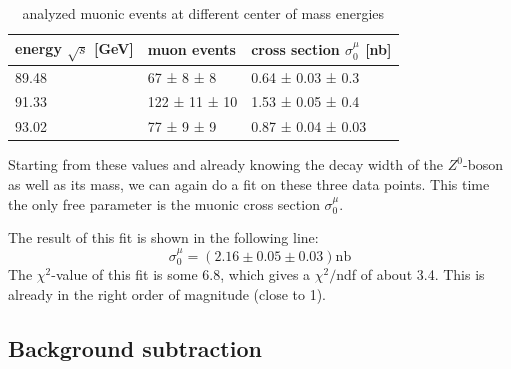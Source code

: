 \documentclass[epj,nopacs]{svjour}
\begin{document}
\begin{table}[h]
\begin{center}
\begin{tabular}{|l|l|l|}
\hline
energy $\sqrt{s}$ [\si{\GeV}] & muon events & cross section $σ_0^μ$ [\si{\nano\barn}]\\
\hline
89.48 & \phantom{0}67 ± \phantom{0}8 ± \phantom{0}8  & 0.64 ± 0.03 ± 0.3 \\
91.33 & 122 ± 11 ± 10 & 1.53 ± 0.05 ± 0.4 \\
93.02 & \phantom{0}77 ± \phantom{0}9 ± \phantom{0}9 & 0.87 ± 0.04 ± 0.03 \\
\hline
\end{tabular}
\vspace*{0.3cm}
\caption{\baselineskip=0.38cm analyzed muonic events at different center of mass
energies}
\label{tab:muon_events}
\end{center}
\vspace*{-0.5cm}
\end{table}

Starting from these values and already knowing the decay width of the $Z^0$-boson as well as its mass, we can again do a fit on these three data points. This time the only free parameter is the muonic cross section $σ_0^μ$.

The result of this fit is shown in the following line:
\begin{equation}
σ_0^μ = (2.16 \pm 0.05 \pm 0.03) \si{\nano\barn}
\end{equation}
The $χ^2$-value of this fit is some 6.8, which gives a $χ^2/$ndf of about 3.4.
This is already in the right order of magnitude (close to 1).

\subsection{Background subtraction}
\end{document}
